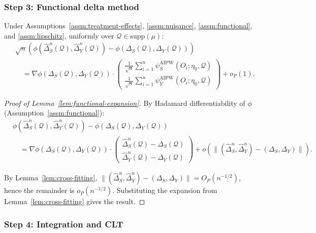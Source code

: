 \subsubsection{Step 3: Functional delta method}

\begin{lemma}
\label{lem:functional-expansion}
Under Assumptions~\ref{assm:treatment-effects}, \ref{assm:nuisance}, \ref{assm:functional}, and \ref{assm:lipschitz}, uniformly over $\mathcal{Q} \in \text{supp}(\mu)$:
\begin{align}
&\sqrt{n}(\phi(\hat{\Delta}_S^n(\mathcal{Q}), \hat{\Delta}_Y^n(\mathcal{Q})) - \phi(\Delta_S(\mathcal{Q}), \Delta_Y(\mathcal{Q}))) \nonumber \\
&\quad = \nabla\phi(\Delta_S(\mathcal{Q}), \Delta_Y(\mathcal{Q})) \cdot \begin{pmatrix} \frac{1}{\sqrt{n}}\sum_{i=1}^n \psi_S^{\text{AIPW}}(O_i; \eta_0, \mathcal{Q}) \\ \frac{1}{\sqrt{n}}\sum_{i=1}^n \psi_Y^{\text{AIPW}}(O_i; \eta_0, \mathcal{Q}) \end{pmatrix} + o_P(1).
\end{align}
\end{lemma}

\begin{proof}[Proof of Lemma~\ref{lem:functional-expansion}]
By Hadamard differentiability of $\phi$ (Assumption~\ref{assm:functional}):
\begin{align}
&\phi(\hat{\Delta}_S^n(\mathcal{Q}), \hat{\Delta}_Y^n(\mathcal{Q})) - \phi(\Delta_S(\mathcal{Q}), \Delta_Y(\mathcal{Q})) \\
&\quad = \nabla\phi(\Delta_S(\mathcal{Q}), \Delta_Y(\mathcal{Q})) \cdot \begin{pmatrix} \hat{\Delta}_S^n(\mathcal{Q}) - \Delta_S(\mathcal{Q}) \\ \hat{\Delta}_Y^n(\mathcal{Q}) - \Delta_Y(\mathcal{Q}) \end{pmatrix} + o(\|(\hat{\Delta}_S^n, \hat{\Delta}_Y^n) - (\Delta_S, \Delta_Y)\|).
\end{align}

By Lemma~\ref{lem:cross-fitting}, $\|(\hat{\Delta}_S^n, \hat{\Delta}_Y^n) - (\Delta_S, \Delta_Y)\| = O_P(n^{-1/2})$, hence the remainder is $o_P(n^{-1/2})$. Substituting the expansion from Lemma~\ref{lem:cross-fitting} gives the result.
\end{proof}

\subsubsection{Step 4: Integration and CLT}


